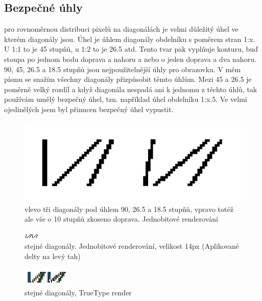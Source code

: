 \documentclass[a4paper]{article}
\begin{document}
\subsection{Bezpečné úhly}
pro rovnoměrnou distribuci pixelů na diagonálách je velmi důležitý úhel ve kterém diagonály jsou. Úhel je úhlem diagonály obdelníku s poměrem stran 1:x. U 1:1 to je 45 stupňů, u 1:2 to je 26.5 atd. Tento tvar pak vyplňuje konturu, buď stoupa po jednom bodu doprava a nahoru a nebo o jeden doprava a dva nahoru.
90,
45,
26.5 a 
18.5 stupňů jsou nejpoužitelnější úhly pro obrazovku. V mém písmu se snažím všechny diagonály přizpůsobit těmto úhlům. Mezi 45 a 26.5 je poměrně velký rozdíl a když diagonála nespadá ani k jednomu z těchto úhlů, tak používám umělý bezpečný úhel, tzn. například úhel obdelníku 1:x.5. Ve velmi ojedinělých jsem byl přinucen bezpečný úhel vypustit. 

\begin{figure}[H]
  \includegraphics[width=\linewidth]{pics/1bit.png}
  \caption{vlevo tři diagonály pod úhlem 90, 26.5 a 18.5 stupňů, vpravo totéž ale vše o 10 stupňů zkoseno doprava. Jednobitové renderování}
\end{figure}

\begin{figure}[H]
  \includegraphics[width=\linewidth]{pics/bw.png}
  \caption{stejné diagonály. Jednobitové renderování, velikost 14px (Aplikované delty na levý tah)}
\end{figure}

\begin{figure}[H]
  \includegraphics[width=\linewidth]{pics/truetype.png}
  \caption{stejné diagonály, TrueType render}
\end{figure}
\end{document}
